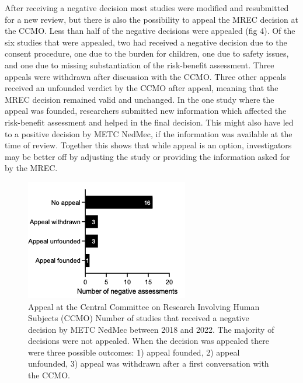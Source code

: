 \documentclass[authordate, empirical]{jote-new-article}
\begin{document}
	After receiving a negative decision most studies were modified and resubmitted for a new review, but there is also the possibility to appeal the MREC decision at the CCMO. Less than half of the negative decisions were appealed (fig 4). Of the six studies that were appealed, two had received a negative decision due to the consent procedure, one due to the burden for children, one due to safety issues, and one due to missing substantiation of the risk-benefit assessment. Three appeals were withdrawn after discussion with the CCMO. Three other appeals received an unfounded verdict by the CCMO after appeal, meaning that the MREC decision remained valid and unchanged. In the one study where the appeal was founded, researchers submitted new information which affected the risk-benefit assessment and helped in the final decision. This might also have led to a positive decision by METC NedMec, if the information was available at the time of review. Together this shows that while appeal is an option, investigators may be better off by adjusting the study or providing the information asked for by the MREC.



	\begin{figure}
		\begin{fullwidth}
	
		\includegraphics[width=\linewidth]{media/Picture4.png}

		\caption{Appeal at the Central Committee on Research Involving Human Subjects (CCMO) 
		Number of studies that received a negative decision by METC NedMec between 2018 and 2022. The majority of decisions were not appealed. When the decision was appealed there were three possible outcomes: 1) appeal founded, 2) appeal unfounded, 3) appeal was withdrawn after a first conversation with the CCMO.}

		\label{fig:rId14}
		\end{fullwidth}
	\end{figure}
\end{document}
